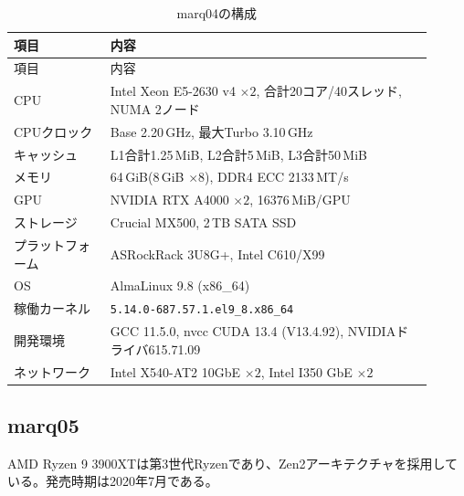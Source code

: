 \documentclass[../main.tex]{subfiles}
\begin{document}
\begingroup
\small
\renewcommand{\arraystretch}{1.2}
\begin{longtable}{|p{0.21\linewidth}|p{0.70\linewidth}|}
\caption{marq04の構成}\label{tab:environment-marq04}\\
\hline
項目 & 内容 \\
\hline
\endfirsthead
\hline
項目 & 内容 \\
\hline
\endhead
CPU & Intel Xeon E5-2630 v4 $\times 2$, 合計20コア/40スレッド, NUMA 2ノード \\
\hline
CPUクロック & Base 2.20\,GHz, 最大Turbo 3.10\,GHz \\
\hline
キャッシュ & L1合計1.25\,MiB, L2合計5\,MiB, L3合計50\,MiB \\
\hline
メモリ & 64\,GiB(8\,GiB $\times 8$), DDR4 ECC 2133\,MT/s \\
\hline
GPU & NVIDIA RTX A4000 $\times 2$, 16376\,MiB/GPU \\
\hline
ストレージ & Crucial MX500, 2\,TB SATA SSD \\
\hline
プラットフォーム & ASRockRack 3U8G+, Intel C610/X99 \\
\hline
OS & AlmaLinux 9.8 (x86\_64) \\
\hline
稼働カーネル & \texttt{5.14.0-687.57.1.el9\_8.x86\_64} \\
\hline
開発環境 & GCC 11.5.0, nvcc CUDA 13.4 (V13.4.92), NVIDIAドライバ615.71.09 \\
\hline
ネットワーク & Intel X540-AT2 10GbE $\times 2$, Intel I350 GbE $\times 2$ \\
\hline
\end{longtable}
\endgroup


\subsection{marq05}
\label{sec:environment-marq05}
AMD Ryzen 9 3900XTは第3世代Ryzenであり、Zen2アーキテクチャを採用している。発売時期は2020年7月である。
\end{document}
